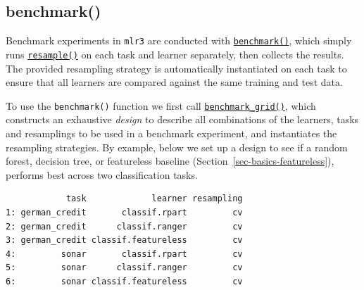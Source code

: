 \hypertarget{sec-bm-design}{%
\subsection{benchmark()}\label{sec-bm-design}}

Benchmark experiments in \texttt{mlr3} are
conducted with
\href{https://mlr3.mlr-org.com/reference/benchmark.html}{\texttt{benchmark()}},
which simply runs
\href{https://mlr3.mlr-org.com/reference/resample.html}{\texttt{resample()}}
on each task and learner separately, then collects the results. The
provided resampling strategy is automatically instantiated on each task
to ensure that all learners are compared against the same training and
test data.

To use the \texttt{benchmark()} function we first call
\href{https://mlr3.mlr-org.com/reference/benchmark_grid.html}{\texttt{benchmark\_grid()}},
which constructs an exhaustive \emph{design} to describe all
combinations of the learners, tasks and resamplings to be used in a
benchmark experiment, and instantiates the resampling strategies. By
example, below we set up a design to see if a random forest, decision
tree, or featureless baseline (Section~\ref{sec-basics-featureless}),
performs best across two classification tasks.

\begin{Shaded}
\begin{Highlighting}[]
\OtherTok{=} \NormalTok{(}\NormalTok{(}\NormalTok{, }\NormalTok{))}
\OtherTok{=} \NormalTok{(}\NormalTok{(}\NormalTok{, }\NormalTok{,}
  \NormalTok{), } \NormalTok{)}
\OtherTok{=} \NormalTok{(}\NormalTok{, } \NormalTok{)}

\OtherTok{=} 
\end{Highlighting}
\end{Shaded}

\begin{verbatim}
            task             learner resampling
1: german_credit       classif.rpart         cv
2: german_credit      classif.ranger         cv
3: german_credit classif.featureless         cv
4:         sonar       classif.rpart         cv
5:         sonar      classif.ranger         cv
6:         sonar classif.featureless         cv
\end{verbatim}

